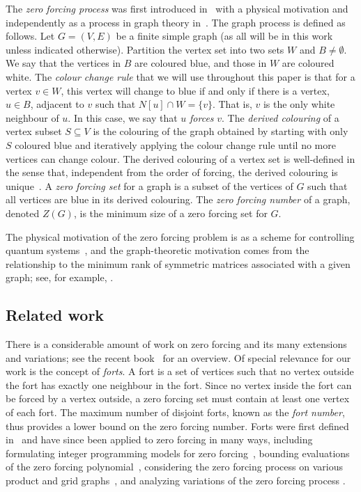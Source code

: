 \documentclass[12pt]{amsart}
\theoremstyle{plain}
\theoremstyle{definition}
\begin{document}
The \emph{zero forcing process} was first introduced in~\cite{PhysicsFirst} with a physical motivation and independently as a process in graph theory in~\cite{barioli2008zero}. The graph process is defined as follows.
Let $G = (V, E)$ be a finite simple graph (as all will be in this work unless indicated otherwise). Partition the vertex set into two sets $W$ and $B\neq\emptyset$. We say that the vertices in $B$ are coloured blue, and those in $W$ are coloured white. The \textit{colour change rule} that we will use throughout this paper is that for a vertex $v\in W$, this vertex will change to blue if and only if there is a vertex, $u\in B$, adjacent to $v$ such that $N[u]\cap W=\{v\}$. That is, $v$ is the only white neighbour of $u$. In this case, we say that $u$ \emph{forces} $v$. The \textit{derived colouring} of a vertex subset $S\subseteq V$ is the colouring of the graph obtained by starting with only $S$ coloured blue and iteratively applying the colour change rule until no more vertices can change colour. 
The derived colouring of a vertex set is well-defined in the sense that, independent from the order of forcing, the derived colouring is unique~\cite{barioli2008zero,barioli2010problems}.
A \textit{zero forcing set} for a graph is a subset of the vertices of $G$ such that all vertices are blue in its derived colouring. The \textit{zero forcing number} of a graph, denoted $Z(G)$, is the minimum size of a zero forcing set for $G$. 


The physical motivation of the zero forcing problem is as a scheme for controlling quantum systems~\cite{PhysicsQuantum}, and the graph-theoretic motivation comes from the relationship to the minimum rank of symmetric matrices associated with a given graph; see, for example, \cite{barioli2008zero,FALLAT2007558,hogben2022book}. 

\subsection{Related work}
There is a considerable amount of work on zero forcing and its many extensions and variations; see the recent book~\cite{hogben2022book} for an overview. Of special relevance for our work is the concept of \emph{forts}. A fort is a set of vertices such that no vertex outside the fort has exactly one neighbour in the fort. Since no vertex inside the fort can be forced by a vertex outside, a zero forcing set must contain at least one vertex of each fort. The maximum number of disjoint forts, known as the \emph{fort number}, thus provides a lower bound on the zero forcing number.
Forts were first defined in~\cite{fast2018effects} and have since been applied to zero forcing in many ways, including formulating integer programming models for zero forcing~\cite{BrimkovFastHicks2019}, bounding evaluations of the zero forcing polynomial~\cite{boyer2019zfpolyn}, considering the zero forcing process on various product and grid graphs~\cite{BEAUDOUINLAFON202035,KARST2020380}, and analyzing variations of the zero forcing process \cite{cameron2023forts}.
\end{document}
